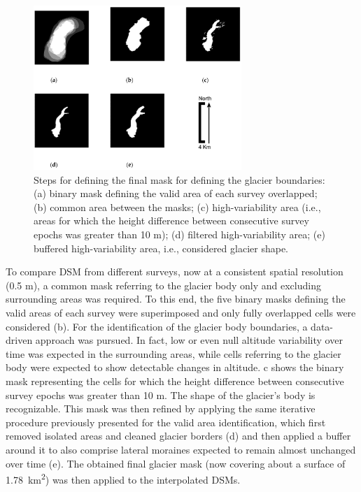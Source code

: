 \begin{figure}[ht]
    \centering
    \includegraphics[width=0.7\textwidth]{glacier_masks.png}
    \caption{Steps for defining the final mask for defining the glacier boundaries: (a) binary mask defining the valid area of each survey overlapped; (b) common area between the masks; (c) high-variability area (i.e., areas for which the height difference between consecutive survey epochs was greater than 10 m); (d) filtered high-variability area; (e) buffered high-variability area, i.e., considered glacier shape. }
    \label{fig:2:glacier_masks}
\end{figure}

To compare DSM from different surveys, now at a consistent spatial resolution (0.5 m), a common mask referring to the glacier body only and excluding surrounding areas was required.
To this end, the five binary masks defining the valid areas of each survey were superimposed and only fully overlapped cells were considered (b).
For the identification of the glacier body boundaries, a data-driven approach was pursued. 
In fact, low or even null altitude variability over time was expected in the surrounding areas, while cells referring to the glacier body were expected to show detectable changes in altitude. 
c shows the binary mask representing the cells for which the height difference between consecutive survey epochs was greater than 10 m. 
The shape of the glacier's body is recognizable. 
This mask was then refined by applying the same iterative procedure previously presented for the valid area identification, which first removed isolated areas and cleaned glacier borders (d) and then applied a buffer around it to also comprise lateral moraines expected to remain almost unchanged over time (e). 
The obtained final glacier mask (now covering about a surface of \SI{1.78}{\kilo\meter\squared}) was then applied to the interpolated DSMs.

